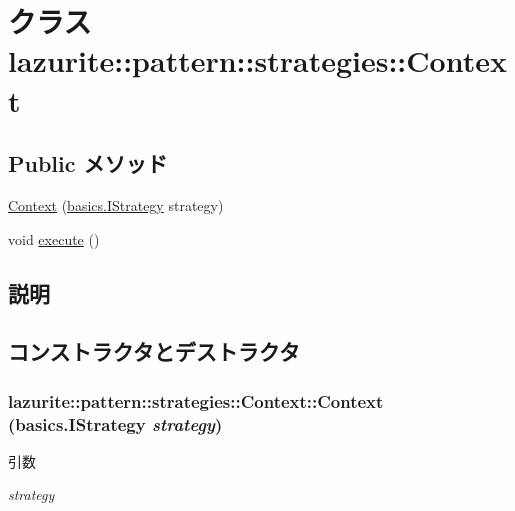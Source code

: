 \hypertarget{classlazurite_1_1pattern_1_1strategies_1_1_context}{
\section{クラス lazurite::pattern::strategies::Context}
\label{classlazurite_1_1pattern_1_1strategies_1_1_context}
}
\subsection*{Public メソッド}
\begin{DoxyCompactItemize}
\item 
\hyperlink{classlazurite_1_1pattern_1_1strategies_1_1_context_a7f77318460359f53f64c17b98f705b50}{Context} (\hyperlink{interfacelazurite_1_1pattern_1_1basics_1_1_i_strategy}{basics.IStrategy} strategy)
\item 
void \hyperlink{classlazurite_1_1pattern_1_1strategies_1_1_context_ac4258d4e4aa5d69ae0db8e8fee45f8f8}{execute} ()
\end{DoxyCompactItemize}


\subsection{説明}


\subsection{コンストラクタとデストラクタ}
\hypertarget{classlazurite_1_1pattern_1_1strategies_1_1_context_a7f77318460359f53f64c17b98f705b50}{
\subsubsection[{Context}]{\setlength{\rightskip}{0pt plus 5cm}lazurite::pattern::strategies::Context::Context ({\bf basics.IStrategy} {\em strategy})}}
\label{classlazurite_1_1pattern_1_1strategies_1_1_context_a7f77318460359f53f64c17b98f705b50}

\begin{DoxyParams}{引数}
\item[{\em strategy}]\end{DoxyParams}


